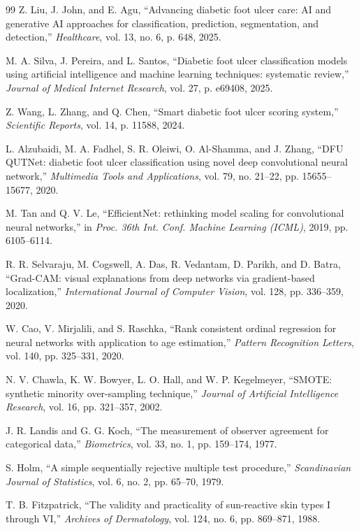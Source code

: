 \begin{thebibliography}{99}
Z. Liu, J. John, and E. Agu, ``Advancing diabetic foot ulcer care: AI and
generative AI approaches for classification, prediction, segmentation, and
detection,'' \emph{Healthcare}, vol. 13, no. 6, p. 648, 2025.

M. A. Silva, J. Pereira, and L. Santos, ``Diabetic foot ulcer
classification models using artificial intelligence and machine learning
techniques: systematic review,'' \emph{Journal of Medical Internet
Research}, vol. 27, p. e69408, 2025.

Z. Wang, L. Zhang, and Q. Chen, ``Smart diabetic foot ulcer scoring
system,'' \emph{Scientific Reports}, vol. 14, p. 11588, 2024.

L. Alzubaidi, M. A. Fadhel, S. R. Oleiwi, O. Al-Shamma, and J. Zhang, ``DFU
QUTNet: diabetic foot ulcer classification using novel deep convolutional
neural network,'' \emph{Multimedia Tools and Applications}, vol. 79,
no. 21--22, pp. 15655--15677, 2020.

M. Tan and Q. V. Le, ``EfficientNet: rethinking model scaling for
convolutional neural networks,'' in \emph{Proc. 36th Int. Conf. Machine
Learning (ICML)}, 2019, pp. 6105--6114.

R. R. Selvaraju, M. Cogswell, A. Das, R. Vedantam, D. Parikh, and
D. Batra, ``Grad-CAM: visual explanations from deep networks via
gradient-based localization,'' \emph{International Journal of Computer
Vision}, vol. 128, pp. 336--359, 2020.

W. Cao, V. Mirjalili, and S. Raschka, ``Rank consistent ordinal regression
for neural networks with application to age estimation,'' \emph{Pattern
Recognition Letters}, vol. 140, pp. 325--331, 2020.

N. V. Chawla, K. W. Bowyer, L. O. Hall, and W. P. Kegelmeyer, ``SMOTE:
synthetic minority over-sampling technique,'' \emph{Journal of Artificial
Intelligence Research}, vol. 16, pp. 321--357, 2002.

J. R. Landis and G. G. Koch, ``The measurement of observer agreement for
categorical data,'' \emph{Biometrics}, vol. 33, no. 1, pp. 159--174, 1977.

S. Holm, ``A simple sequentially rejective multiple test procedure,''
\emph{Scandinavian Journal of Statistics}, vol. 6, no. 2, pp. 65--70, 1979.

T. B. Fitzpatrick, ``The validity and practicality of sun-reactive skin
types I through VI,'' \emph{Archives of Dermatology}, vol. 124, no. 6,
pp. 869--871, 1988.


\end{thebibliography}
